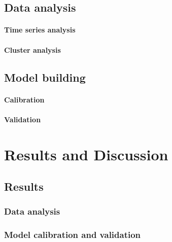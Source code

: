 \documentclass[fleqn,10pt]{SelfArx} %
\begin{document}
\subsection{Data analysis}

\paragraph{Time series analysis} \lipsum[4] %

\paragraph{Cluster analysis} \lipsum[4] %

\subsection{Model building}

\paragraph{Calibration} \lipsum[4] %

\paragraph{Validation} \lipsum[4] %



\section{Results and Discussion}

\lipsum[10] %

\subsection{Results}

\lipsum[11] %

\subsubsection{Data analysis}

\lipsum[12] %

\subsubsection{Model calibration and validation}
\end{document}

